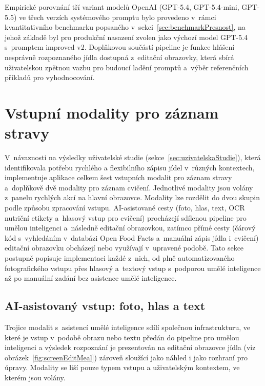 Empirické porovnání tří variant modelů OpenAI (GPT-5.4, GPT-5.4-mini, GPT-5.5) ve třech verzích systémového promptu bylo provedeno v~rámci kvantitativního benchmarku popsaného v~sekci~\ref{sec:benchmarkPresnost}, na jehož základě byl pro produkční nasazení zvolen jako výchozí model GPT-5.4 s~promptem improved v2.
Doplňkovou součástí pipeline je funkce hlášení nesprávně rozpoznaného jídla dostupná z~editační obrazovky, která sbírá uživatelskou zpětnou vazbu pro budoucí ladění promptů a~výběr referenčních příkladů pro vyhodnocování.

\section{Vstupní modality pro záznam stravy}
\label{sec:vstupniModality}

V~návaznosti na výsledky uživatelské studie (sekce~\ref{sec:uzivatelskaStudie}), která identifikovala potřebu rychlého a flexibilního zápisu jídel v~různých kontextech, implementuje aplikace celkem šest vstupních modalit pro záznam stravy a~doplňkově dvě modality pro záznam cvičení.
Jednotlivé modality jsou volány z~panelu rychlých akcí na hlavní obrazovce.
Modality lze rozdělit do dvou skupin podle způsobu zpracování vstupu.
AI-asistované cesty (foto, hlas, text, OCR nutriční etikety a~hlasový vstup pro cvičení) procházejí sdílenou pipeline pro umělou inteligenci a~následně editační obrazovkou, zatímco přímé cesty (čárový kód s~vyhledáním v~databázi Open Food Facts a~manuální zápis jídla i~cvičení) editační obrazovku obcházejí nebo využívají v~upravené podobě.
Tato sekce postupně popisuje implementaci každé z~nich, od plně automatizovaného fotografického vstupu přes hlasový a~textový vstup s~podporou umělé inteligence až po manuální zadání bez asistence umělé inteligence.

\subsection{AI-asistovaný vstup: foto, hlas a text}
\label{subsec:aiVstup}

Trojice modalit s~asistencí umělé inteligence sdílí společnou infrastrukturu, ve které je vstup v~podobě obrazu nebo textu předán do pipeline pro umělou inteligenci a výsledek rozpoznání je prezentován na editační obrazovce jídla (viz obrázek~\ref{fig:screenEditMeal}) zároveň sloužící jako náhled i jako rozhraní pro úpravy.
Modality se liší pouze typem vstupu a uživatelským kontextem, ve kterém jsou volány.

